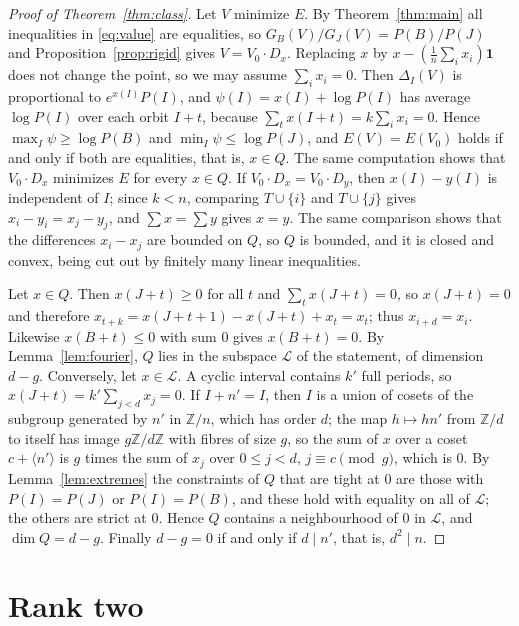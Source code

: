 \documentclass[11pt]{article}
\theoremstyle{remark}
\newcommand{\Z}{\mathbb{Z}}
\begin{document}
\begin{proof}[Proof of Theorem~\ref{thm:class}]
Let $V$ minimize $E$. By Theorem~\ref{thm:main} all inequalities in \eqref{eq:value} are equalities, so $G_B(V)/G_J(V)=P(B)/P(J)$ and Proposition~\ref{prop:rigid} gives $V=V_0\cdot D_x$. Replacing $x$ by $x-(\tfrac1n\sum_ix_i)\mathbf{1}$ does not change the point, so we may assume $\sum_ix_i=0$. Then $\Delta_I(V)$ is proportional to $e^{x(I)}P(I)$, and $\psi(I)=x(I)+\log P(I)$ has average $\log P(I)$ over each orbit $I+t$, because $\sum_tx(I+t)=k\sum_ix_i=0$. Hence $\max_I\psi\ge\log P(B)$ and $\min_I\psi\le\log P(J)$, and $E(V)=E(V_0)$ holds if and only if both are equalities, that is, $x\in Q$. The same computation shows that $V_0\cdot D_x$ minimizes $E$ for every $x\in Q$. If $V_0\cdot D_x=V_0\cdot D_y$, then $x(I)-y(I)$ is independent of $I$; since $k<n$, comparing $T\cup\{i\}$ and $T\cup\{j\}$ gives $x_i-y_i=x_j-y_j$, and $\sum x=\sum y$ gives $x=y$. The same comparison shows that the differences $x_i-x_j$ are bounded on $Q$, so $Q$ is bounded, and it is closed and convex, being cut out by finitely many linear inequalities.

Let $x\in Q$. Then $x(J+t)\ge0$ for all $t$ and $\sum_tx(J+t)=0$, so $x(J+t)=0$ and therefore $x_{t+k}=x(J+t+1)-x(J+t)+x_t=x_t$; thus $x_{i+d}=x_i$. Likewise $x(B+t)\le0$ with sum $0$ gives $x(B+t)=0$. By Lemma~\ref{lem:fourier}, $Q$ lies in the subspace $\mathcal{L}$ of the statement, of dimension $d-g$. Conversely, let $x\in\mathcal{L}$. A cyclic interval contains $k'$ full periods, so $x(J+t)=k'\sum_{j<d}x_j=0$. If $I+n'=I$, then $I$ is a union of cosets of the subgroup generated by $n'$ in $\Z/n$, which has order $d$; the map $h\mapsto hn'$ from $\Z/d$ to itself has image $g\Z/d\Z$ with fibres of size $g$, so the sum of $x$ over a coset $c+\langle n'\rangle$ is $g$ times the sum of $x_j$ over $0\le j<d$, $j\equiv c\pmod g$, which is $0$. By Lemma~\ref{lem:extremes} the constraints of $Q$ that are tight at $0$ are those with $P(I)=P(J)$ or $P(I)=P(B)$, and these hold with equality on all of $\mathcal{L}$; the others are strict at $0$. Hence $Q$ contains a neighbourhood of $0$ in $\mathcal{L}$, and $\dim Q=d-g$. Finally $d-g=0$ if and only if $d\mid n'$, that is, $d^2\mid n$.
\end{proof}

\section{Rank two}\label{sec:rank2}
\end{document}
